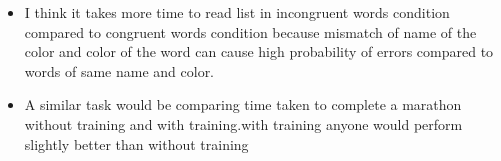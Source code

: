 \documentclass[11pt]{article}
\providecommand{\tightlist}{%
      \setlength{\itemsep}{0pt}\setlength{\parskip}{0pt}}
\begin{document}
    \begin{itemize}
\tightlist
\item
  I think it takes more time to read list in incongruent words condition
  compared to congruent words condition because mismatch of name of the
  color and color of the word can cause high probability of errors
  compared to words of same name and color.
\item
  A similar task would be comparing time taken to complete a marathon
  without training and with training.with training anyone would perform
  slightly better than without training
\end{itemize}


    
    
    
    
\end{document}
